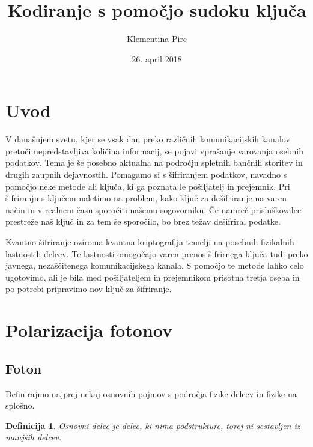 \documentclass[A4paper, 11pt]{article}
\title{Kodiranje s pomočjo sudoku ključa}
\author{Klementina Pirc}
\affil{Fakulteta za matematiko in fiziko \\ Oddelek za matematiko}
\date{26. april 2018}
\newtheorem{definicija}{Definicija}
\begin{document}
\begin{titlepage} 

\maketitle
\thispagestyle{empty}
	
\end{titlepage}



\section{Uvod}

V današnjem svetu, kjer se vsak dan preko različnih komunikacijskih kanalov pretoči nepredstavljiva količina informacij, se pojavi vprašanje varovanja osebnih podatkov. Tema je še posebno aktualna na področju spletnih bančnih storitev in drugih zaupnih dejavnostih. Pomagamo si s šifriranjem podatkov, navadno s pomočjo neke metode ali ključa, ki ga poznata le pošiljatelj in prejemnik. Pri šifriranju s ključem naletimo na problem, kako ključ za dešifriranje na varen način in v realnem času sporočiti našemu sogovorniku. Če namreč prisluškovalec prestreže naš ključ in za tem še sporočilo, bo brez težav dešifriral podatke.

Kvantno šifriranje oziroma kvantna kriptografija temelji na posebnih fizikalnih lastnostih delcev. Te lastnosti omogočajo varen prenos šifrirnega ključa tudi preko javnega, nezaščitenega komunikacijskega kanala. S pomočjo te metode lahko celo ugotovimo, ali je bila med pošiljateljem in prejemnikom prisotna tretja oseba in po potrebi pripravimo nov ključ za šifriranje.



\section{Polarizacija fotonov}

\subsection{Foton}

Definirajmo najprej nekaj osnovnih pojmov s področja fizike delcev in fizike na splošno.

\begin{definicija}
Osnovni delec je delec, ki nima podstrukture, torej ni sestavljen iz manjših delcev.
\end{definicija}
\end{document}
